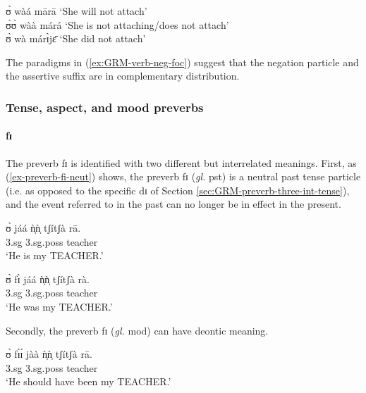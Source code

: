 \begin{exe}
\begin{exe}
\begin{exe}
{\begin{exe}
\begin{exe}
\begin{exe}
\begin{exe}
\begin{exe}
\begin{exe}
\begin{exe}
\begin{exe}
\begin{exe}
\begin{exe}
\begin{exe}
\begin{exe}
\begin{exe}
\begin{exe}
\begin{exe}
\begin{exe}
\begin{exe}
\begin{exe}
\begin{exe}
\begin{exe}
 ʊ̀ wàá mārā  {\rm `She will not attach'}\\
   ʊ̀ʊ̀ wàà márá {\rm  `She  is  not attaching/does not attach'}\\
  ʊ̀ wà márɪ̀jɛ̄   {\rm  `She   did not attach'}\\


\z 
 \z

The paradigms in (\ref{ex:GRM-verb-neg-foc})  suggest that the negation 
particle 
and the assertive suffix are in complementary distribution. 

\subsubsection{Tense, aspect, and mood preverbs}
\label{sec:GRM-verb-neg}


\paragraph{fɪ}

The preverb {\sls fɪ}   is identified with two different but interrelated 
meanings.  First, as (\ref{ex-preverb-fi-neut}) shows, the preverb {\sls fɪ}  
({\it gl.} {\sc pst}) is a neutral past tense particle (i.e.  as opposed to the 
specific  {\sls dɪ} of  Section \ref{sec:GRM-preverb-three-int-tense}), and the 
event referred to in the past can no longer be in effect in the present.


\ea\label{ex-preverb-fi-neut}

\ea
\gll ʊ̀ jáá  ǹ̩ǹ̩ tʃítʃà rā.\\
  {\sc 3.sg} {\ident} {\sc 3.sg.poss}  teacher {\foc}\\
\glt  `He is my TEACHER.' 

\ex
\gll   ʊ̀  fɪ̀ jáá  ǹ̩ǹ̩ tʃítʃà rà.\\
  {\sc 3.sg} {\pst} {\ident} {\sc 3.sg.poss}  teacher {\foc}\\  
\glt  `He was my TEACHER.' 

\z 
 \z 

 Secondly, the preverb {\sls fɪ}   ({\it gl.} {\sc mod}) can have  deontic
meaning.  


\ea\label{ex-preverb-fi-deonc}

\ea\label{ex-preverb-fi-deonc-pos}
\gll ʊ̀ fɪ̀ɪ́ jàà  ǹ̩ǹ̩ tʃítʃà rā.\\
  {\sc 3.sg}  {\mod}  {\ident} {\sc 3.sg.poss}  teacher {\foc}\\
\glt  `He should have been my TEACHER.' 


\end{exe}
\end{exe}
\end{exe}
\end{exe}
\end{exe}
\end{exe}
\end{exe}
\end{exe}
\end{exe}
\end{exe}
\end{exe}
\end{exe}
\end{exe}
\end{exe}
\end{exe}
\end{exe}
\end{exe}
\end{exe}
\end{exe}
\end{exe}}
\end{exe}
\end{exe}
\end{exe}
